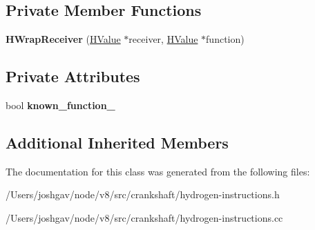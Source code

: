 \subsection*{Private Member Functions}
\begin{DoxyCompactItemize}
\item 
{\bfseries H\+Wrap\+Receiver} (\hyperlink{classv8_1_1internal_1_1_h_value}{H\+Value} $\ast$receiver, \hyperlink{classv8_1_1internal_1_1_h_value}{H\+Value} $\ast$function)\hypertarget{classv8_1_1internal_1_1_h_wrap_receiver_a9d806a0d5a2fde1dbba8d8791de196b6}{}\label{classv8_1_1internal_1_1_h_wrap_receiver_a9d806a0d5a2fde1dbba8d8791de196b6}

\end{DoxyCompactItemize}
\subsection*{Private Attributes}
\begin{DoxyCompactItemize}
\item 
bool {\bfseries known\+\_\+function\+\_\+}\hypertarget{classv8_1_1internal_1_1_h_wrap_receiver_a97aaeb04bf08ba07e6b8bf217b2e4063}{}\label{classv8_1_1internal_1_1_h_wrap_receiver_a97aaeb04bf08ba07e6b8bf217b2e4063}

\end{DoxyCompactItemize}
\subsection*{Additional Inherited Members}


The documentation for this class was generated from the following files\+:\begin{DoxyCompactItemize}
\item 
/\+Users/joshgav/node/v8/src/crankshaft/hydrogen-\/instructions.\+h\item 
/\+Users/joshgav/node/v8/src/crankshaft/hydrogen-\/instructions.\+cc\end{DoxyCompactItemize}
